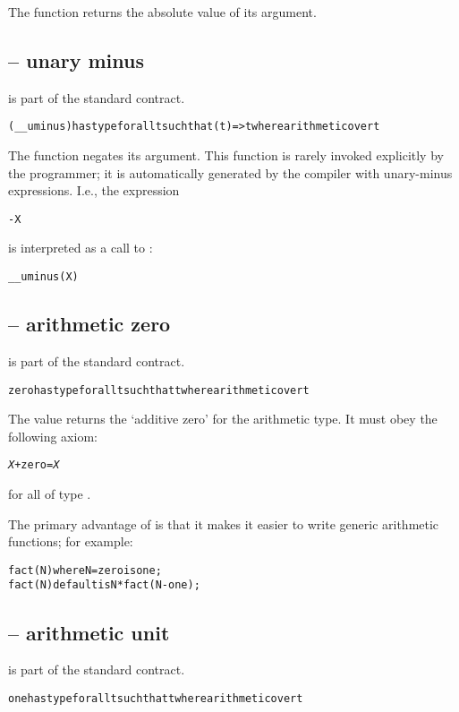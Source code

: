The  function returns the absolute value of its argument.

\subsection{ -- unary minus}
\label{unaryMinus}
 is part of the standard  contract.
\begin{alltt}
(\_\_uminus) has type for all t such that (t)=>t where arithmetic over t
\end{alltt}
The  function negates its argument. This function is rarely invoked explicitly by the programmer; it is automatically generated by the compiler with unary-minus expressions. I.e., the expression
\begin{alltt}
-X
\end{alltt}
is interpreted as a call to :
\begin{alltt}
\_\_uminus(X)
\end{alltt}

\subsection{ -- arithmetic zero}
\label{zero}
 is part of the standard  contract.
\begin{alltt}
zero has type for all t such that t where arithmetic over t
\end{alltt}

The  value returns the `additive zero' for the arithmetic type. It must obey the following axiom:

\begin{alltt}
\emph{X}+zero=\emph{X}
\end{alltt}
for all  of type .

The primary advantage of  is that it makes it easier to write generic arithmetic functions; for example:

\begin{alltt}
fact(N) where N=zero is one;
fact(N) default is N*fact(N-one);
\end{alltt}


\subsection{ -- arithmetic unit}
\label{one}
 is part of the standard  contract.
\begin{alltt}
one has type for all t such that t where arithmetic over t
\end{alltt}

